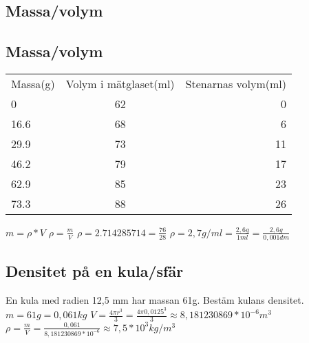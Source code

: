 \documentclass[a4paper,11pt]{article}
\begin{document}
\begin{flushleft}
\section{Massa/volym}

\subsection{Massa/volym}


\begin{tabular}{l c r}
  Massa(g) & Volym i mätglaset(ml) & Stenarnas volym(ml)\\
  0 & 62 & 0\\
  16.6 & 68 & 6\\
  29.9 & 73 & 11\\
  46.2 & 79 & 17\\
  62.9 & 85 & 23\\
  73.3 & 88 & 26\\
\end{tabular}
\newline
\newline
$ m = \rho * V  $
\newline
$ \rho = \frac{m}{V} $
\newline
$ \rho = 2.714285714 = \frac{76}{28} $\newline
$ \rho = 2,7 g/ml = \frac{2,6 g}{1 ml} = \frac{2,6 g}{0,001 dm} $
\newpage

\subsection{Densitet på en kula/sfär}
En kula med radien 12,5 mm har massan 61g.\newline
Bestäm kulans densitet.\newline
$ m = 61g = 0,061 kg $\newline
$ V = \frac{4\pi r^3}{3} = \frac{4\pi 0,0125^3}{3} \approx 8,181230869*10^{-6} m^3 $\newline
$ \rho = \frac{m}{V} = \frac{0,061}{8,181230869*10^{-6}} \approx 7,5*10^3 kg/m^3 $\newline
\newline

\end{flushleft}
\end{document}
